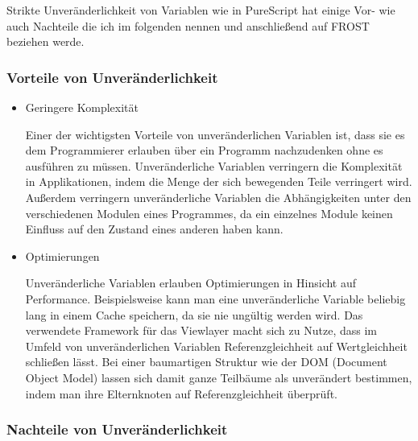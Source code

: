 Strikte Unveränderlichkeit von Variablen wie in PureScript hat einige Vor- wie
auch Nachteile die ich im folgenden nennen und anschließend auf FROST beziehen
werde.

\subsubsection*{Vorteile von Unveränderlichkeit}

\begin{itemize}
\item Geringere Komplexität

  Einer der wichtigsten Vorteile von unveränderlichen Variablen ist, dass sie es
  dem Programmierer erlauben über ein Programm nachzudenken ohne es ausführen zu
  müssen. Unveränderliche Variablen verringern die Komplexität in Applikationen,
  indem die Menge der sich bewegenden Teile verringert wird. Außerdem verringern
  unveränderliche Variablen die Abhängigkeiten unter den verschiedenen Modulen
  eines Programmes, da ein einzelnes Module keinen Einfluss auf den Zustand
  eines anderen haben kann.

\item Optimierungen 

  Unveränderliche Variablen erlauben Optimierungen in Hinsicht auf Performance.
  Beispielsweise kann man eine unveränderliche Variable beliebig lang in einem
  Cache speichern, da sie nie ungültig werden wird. Das verwendete Framework für
  das Viewlayer macht sich zu Nutze, dass im Umfeld von unveränderlichen
  Variablen Referenzgleichheit auf Wertgleichheit schließen lässt. Bei einer
  baumartigen Struktur wie der DOM (Document Object Model) lassen sich damit
  ganze Teilbäume als unverändert bestimmen, indem man ihre Elternknoten auf
  Referenzgleichheit überprüft.

\end{itemize}

\subsubsection*{Nachteile von Unveränderlichkeit}

